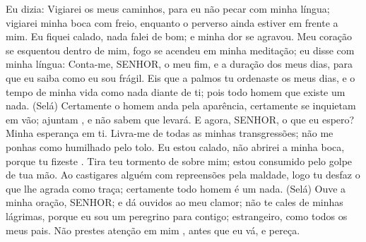 {\PP 
  Eu dizia: Vigiarei os meus caminhos, para eu não pecar com minha língua; vigiarei minha boca com freio, enquanto o perverso ainda estiver em frente a mim.
  Eu fiquei calado, nada falei de bom; e minha dor se agravou.
  Meu coração se esquentou dentro de mim, fogo se acendeu em minha meditação;
{} eu disse com minha língua:
  Conta-me, SENHOR, o meu fim, e a duração dos meus dias, para que eu saiba como eu sou frágil.
  Eis que a palmos tu ordenaste os meus dias, e o tempo de minha vida
{} como nada diante de ti; pois todo homem que existe
{} um nada. (Selá)
  Certamente o homem anda pela aparência, certamente se inquietam em vão; ajuntam
{},  e não sabem que
{} levará.
  E agora, SENHOR, o que eu espero? Minha esperança
{} em ti.
  Livra-me de todas as minhas transgressões; não me ponhas como humilhado pelo tolo.
  Eu estou calado, não abrirei a minha boca, porque tu fizeste
{} .
  Tira teu tormento de sobre mim; estou consumido pelo golpe de tua mão.
  Ao castigares alguém com repreensões pela maldade, logo tu desfaz o que lhe agrada como traça; certamente todo homem é um nada. (Selá)
  Ouve a minha oração, SENHOR; e dá ouvidos ao meu clamor; não te cales de minhas lágrimas, porque eu sou
{} um peregrino para contigo; estrangeiro, como todos os meus pais.
  Não prestes atenção em mim
{},  antes que eu vá, e pereça.
\par }



